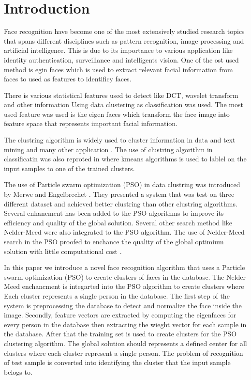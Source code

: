\documentclass[a4paper,twoside]{article}
\begin{document}


%




\section{Introduction}

Face recognition have become one of the most extensively studied research topics that spans different disciplines such as pattern recognition, image processing and artificial intelligence. This is due to its importance to various application like identity authentication, surveillance and intelligents vision. One of the ost used method is egin faces which is used to extract relevant facial information from faces to used as features to identificy faces\cite{}.

There is various statistical features used to detect like DCT, wavelet transform and other information Using data clustering as classification was used. The most used feature was used is the eigen faces which transform the face image into feature space that represents important facial information.


The clustring algorithm is widely used to  cluster information in data and text mining and many other application \cite{}. The use of clustring algorithm in classificatin was also reproted in \cite{} where kmeans algorithms is used to lablel on the input samples to one of the trained clusters. 

The use of Particle swarm optimization (PSO) in data clustring was introduced by Merwe and Engelbrechet \cite{psoclustering}. They presented a system that was test on three different dataset and achieved better clustring than other clustring algorithms. Several enhancment has been added to the PSO algorithms to improve its efficiency and quality of the global solution. Several other search method like Nelder-Meed \cite{}  were also  integrated to the PSO algorithm. The use of Nelder-Meed search in the PSO proofed to enchance the quality of the global optimium solution with little computational cost \cite{}. 


In this paper we introduce a novel face recognition algorithm that uses a Particle swarm optimization (PSO) to create clusters of faces in the database. The Nelder Meed enchancment is integarted into the PSO algorithm to create clusters where Each cluster represents a single person in the database.  The first step of the system is preprocessing the database to detect and normalize the face inside the image. Secondly, feature vectors are extracted by computing the  eigenfaces for every person in the database then extracting the wieght vector for each sample in the database. After that the training set is used to create clusters for the PSO clustering algorithm. The global solution should represents a defined center for all clusters where each cluster represent a single person. The problem of recognition of test sample is converted into identifying the cluster that the input sample belogs to. %
\end{document}
